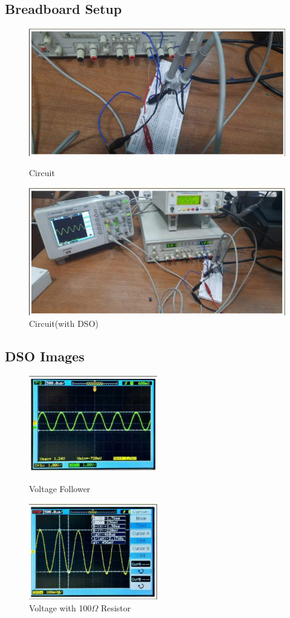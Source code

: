 \documentclass{article}
\begin{document}
\subsection{Breadboard Setup}
\begin{figure}[h!]
\centering
    \includegraphics[width=1.1\textwidth]{i2.png}
    \caption{Circuit}
    \includegraphics[width=1.1\textwidth]{i3.png}
    \caption{Circuit(with DSO)}
\end{figure}
\newpage
\subsection{DSO Images}
\begin{figure}[h]
\centering
    \includegraphics[width=0.5\textwidth]{i4.png}
    \caption{Voltage Follower}
    \includegraphics[width=0.5\textwidth]{i5.png}
    \caption{Voltage with 100$\Omega$ Resistor}
\end{figure}
\end{document}
